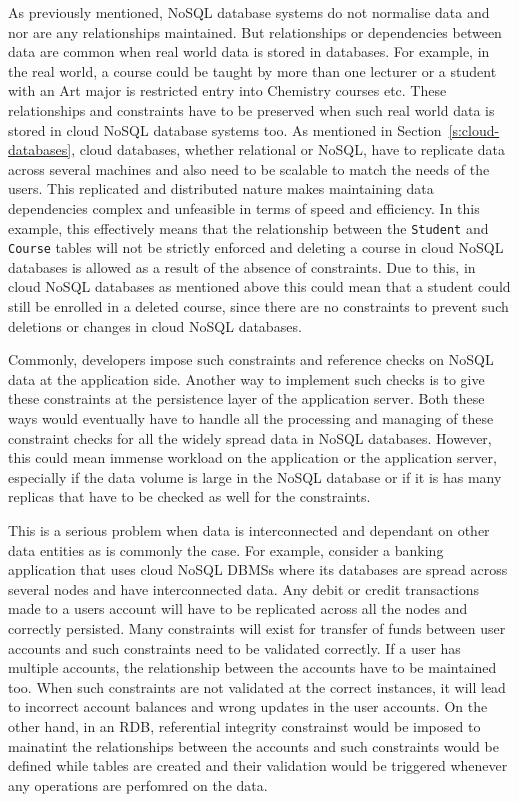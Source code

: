 As previously mentioned, \ac{NoSQL} database systems do not normalise data and
nor are any relationships maintained. But relationships or dependencies between
data are common when real world data is stored in databases. For example, in the
real world, a course could be taught by more than one lecturer or a student with
an Art major is restricted entry into Chemistry courses etc. These relationships
and constraints have to be preserved when such real world data is stored in
cloud \ac{NoSQL} database systems too. As mentioned in
Section~\ref{s:cloud-databases}, cloud databases, whether relational or
\ac{NoSQL}, have to replicate data across several machines and also need to be
scalable to match the needs of the users. This replicated and distributed nature
makes maintaining data dependencies complex and unfeasible in terms of speed and
efficiency. In this example, this effectively means that the relationship
between the \texttt{Student} and \texttt{Course} tables will not be strictly
enforced and deleting a course in cloud \ac{NoSQL} databases is allowed as a
result of the absence of constraints. Due to this, in cloud \ac{NoSQL} databases
as mentioned above this could mean that a student could still be enrolled in a
deleted course, since there are no constraints to prevent such deletions or
changes in cloud \ac{NoSQL} databases.

Commonly, developers impose such constraints and reference checks on \ac{NoSQL}
data at the application side. Another way to implement such checks is to give
these constraints at the persistence layer of the application server. Both these
ways would eventually have to handle all the processing and managing of these
constraint checks for all the widely spread data in \ac{NoSQL} databases.
However, this could mean immense workload on the application or the application
server, especially if the data volume is large in the \ac{NoSQL} database or if it is
has many replicas that have to be checked as well for the constraints.


This is a serious problem when data is interconnected and dependant on other
data entities as is commonly the case. For example, consider a banking
application that uses cloud \ac{NoSQL} \acp{DBMS} where its databases are spread
across several nodes and have interconnected data. Any debit or credit
transactions made to a users account will have to be replicated across all the
nodes and correctly persisted. Many constraints will exist for transfer of funds
between user accounts and such constraints need to be validated correctly. If a
user has multiple accounts, the relationship between the accounts have to be
maintained too. When such constraints are not validated at the correct
instances, it will lead to incorrect account balances and wrong updates in the
user accounts. On the other hand, in an \ac{RDB}, referential integrity
constrainst would be imposed to mainatint the relationships between the
accounts and such constraints would be defined while tables are created and
their validation would be triggered whenever any operations are perfomred on the
data.

